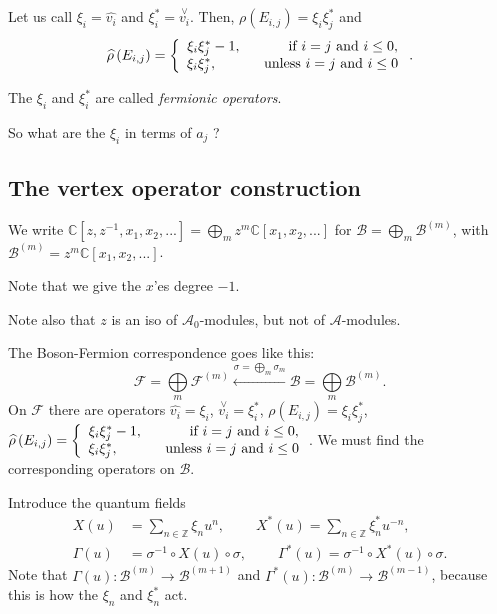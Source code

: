 \documentclass
[numbers=enddot,12pt,final,onecolumn,german,notitlepage]{scrartcl}%
\theoremstyle{definition}
\begin{document}
Let us call $\xi_{i}=\widehat{v_{i}}$ and $\xi_{i}^{\ast}=\overset{\vee
}{v_{i}}$. Then, $\rho\left(  E_{i,j}\right)  =\xi_{i}\xi_{j}^{\ast}$ and
\[
\widehat{\rho}\left(  E_{i,j}\right)  =\left\{
\begin{array}
[c]{c}%
\xi_{i}\xi_{j}^{\ast}-1,\ \ \ \ \ \ \ \ \ \ \text{if }i=j\text{ and }i\leq0,\\
\xi_{i}\xi_{j}^{\ast},\ \ \ \ \ \ \ \ \ \ \text{unless }i=j\text{ and }i\leq0
\end{array}
\right.  .
\]


The $\xi_{i}$ and $\xi_{i}^{\ast}$ are called \textit{fermionic operators}.

So what are the $\xi_{i}$ in terms of $a_{j}$ ?

\subsection{The vertex operator construction}

We write $\mathbb{C}\left[  z,z^{-1},x_{1},x_{2},...\right]  =\bigoplus
\limits_{m}z^{m}\mathbb{C}\left[  x_{1},x_{2},...\right]  $ for $\mathcal{B}%
=\bigoplus\limits_{m}\mathcal{B}^{\left(  m\right)  }$, with $\mathcal{B}%
^{\left(  m\right)  }=z^{m}\mathbb{C}\left[  x_{1},x_{2},...\right]  $.

Note that we give the $x$'es degree $-1$.

Note also that $z$ is an iso of $\mathcal{A}_{0}$-modules, but not of
$\mathcal{A}$-modules.

The Boson-Fermion correspondence goes like this:%
\[
\mathcal{F}=\bigoplus\limits_{m}\mathcal{F}^{\left(  m\right)  }%
\overset{\sigma=\bigoplus\limits_{m}\sigma_{m}}{\leftarrow}\mathcal{B}%
=\bigoplus\limits_{m}\mathcal{B}^{\left(  m\right)  }.
\]
On $\mathcal{F}$ there are operators $\widehat{v_{i}}=\xi_{i}$, $\overset{\vee
}{v_{i}}=\xi_{i}^{\ast}$, $\rho\left(  E_{i,j}\right)  =\xi_{i}\xi_{j}^{\ast}%
$, $\widehat{\rho}\left(  E_{i,j}\right)  =\left\{
\begin{array}
[c]{c}%
\xi_{i}\xi_{j}^{\ast}-1,\ \ \ \ \ \ \ \ \ \ \text{if }i=j\text{ and }i\leq0,\\
\xi_{i}\xi_{j}^{\ast},\ \ \ \ \ \ \ \ \ \ \text{unless }i=j\text{ and }i\leq0
\end{array}
\right.  $. We must find the corresponding operators on $\mathcal{B}$.

Introduce the quantum fields%
\begin{align*}
X\left(  u\right)   &  =\sum\limits_{n\in\mathbb{Z}}\xi_{n}u^{n}%
,\ \ \ \ \ \ \ \ \ \ X^{\ast}\left(  u\right)  =\sum\limits_{n\in\mathbb{Z}%
}\xi_{n}^{\ast}u^{-n},\\
\Gamma\left(  u\right)   &  =\sigma^{-1}\circ X\left(  u\right)  \circ
\sigma,\ \ \ \ \ \ \ \ \ \ \Gamma^{\ast}\left(  u\right)  =\sigma^{-1}\circ
X^{\ast}\left(  u\right)  \circ\sigma.
\end{align*}
Note that $\Gamma\left(  u\right)  :\mathcal{B}^{\left(  m\right)
}\rightarrow\mathcal{B}^{\left(  m+1\right)  }$ and $\Gamma^{\ast}\left(
u\right)  :\mathcal{B}^{\left(  m\right)  }\rightarrow\mathcal{B}^{\left(
m-1\right)  }$, because this is how the $\xi_{n}$ and $\xi_{n}^{\ast}$ act.
\end{document}
